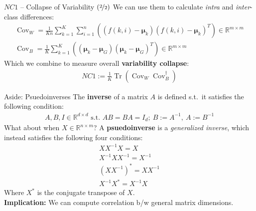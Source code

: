 \documentclass{beamer}
\DeclareMathOperator{\Tr}{Tr}
\DeclareMathOperator{\Cov}{Cov}
\begin{document}
\begin{frame}{$NC1$ -- Collapse of Variability $(\nicefrac{2}{2})$}
	We can use them to calculate \textit{intra} and \textit{inter}-class differences:
	\begin{gather}
		\Cov_W = \frac{1}{Kn} \sum^K_{k=1} \sum^n_{i=1} ((f(k,i) - \bm{\mu}_{k})(f(k,i) - \bm{\mu}_{k})^T) \in \mathbb{R}^{m \times m} \\
		\Cov_B = \frac{1}{K} \sum^K_{k=1} ((\bm{\mu}_{k} - \bm{\mu}_G)(\bm{\mu}_{k} - \bm{\mu}_G)^T) \in \mathbb{R}^{m \times m}
	\end{gather} \pause
	Which we combine to measure overall \textbf{variability collapse}:
	\begin{gather}
		NC1 := \frac{1}{K} \Tr\left( \Cov_W \Cov_B^{\dagger} \right)
	\end{gather}
\end{frame}

\begin{frame}{Aside: Psuedoinverses}
	The \textbf{inverse} of a matrix $A$ is defined s.t.~it satisfies the following condition:
	\begin{gather}
		A, B, I \in \mathbb{R}^{d \times d} \text{ s.t. } AB = BA = I_d;\ B := A^{-1},\ A := B^{-1}
	\end{gather} \pause
	What about when $X \in \mathbb{R}^{n \times m}$? \pause A \textbf{psuedoinverse} is a \textit{generalized inverse}, which instead satisfies the following four conditions:
	\begin{gather}
		XX^{-1}X = X \\
		X^{-1}XX^{-1} = X^{-1} \\
		(XX^{-1})^{*} = XX^{-1} \\
		X^{-1}X^{*} = X^{-1} X
	\end{gather}
	Where $X^{*}$ is the conjugate transpose of $X$. \pause \newline \\

	\textbf{Implication:} We can compute correlation b/w general matrix dimensions.
\end{frame}
\end{document}
